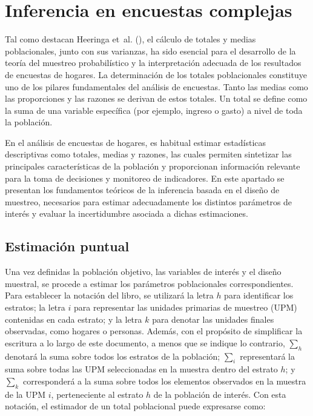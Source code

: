 \documentclass[
  spanish,
  11pt,
  letterpaper,
  oneside,
  open=any]{scrbook}
\begin{document}
\section{Inferencia en encuestas complejas}\label{inferencia-encuestas}

Tal como destacan Heeringa et~al.
(), el cálculo de totales y
medias poblacionales, junto con sus varianzas, ha sido esencial para el
desarrollo de la teoría del muestreo probabilístico y la interpretación
adecuada de los resultados de encuestas de hogares. La determinación de
los totales poblacionales constituye uno de los pilares fundamentales
del análisis de encuestas. Tanto las medias como las proporciones y las
razones se derivan de estos totales. Un total se define como la suma de
una variable específica (por ejemplo, ingreso o gasto) a nivel de toda
la población.

En el análisis de encuestas de hogares, es habitual estimar estadísticas
descriptivas como totales, medias y razones, las cuales permiten
sintetizar las principales características de la población y
proporcionan información relevante para la toma de decisiones y
monitoreo de indicadores. En este apartado se presentan los fundamentos
teóricos de la inferencia basada en el diseño de muestreo, necesarios
para estimar adecuadamente los distintos parámetros de interés y evaluar
la incertidumbre asociada a dichas estimaciones.

\subsection{Estimación puntual}\label{estimacion-puntual}

Una vez definidas la población objetivo, las variables de interés y el
diseño muestral, se procede a estimar los parámetros poblacionales
correspondientes. Para establecer la notación del libro, se utilizará la
letra \(h\) para identificar los estratos; la letra \(i\) para
representar las unidades primarias de muestreo (UPM) contenidas en cada
estrato; y la letra \(k\) para denotar las unidades finales observadas,
como hogares o personas. Además, con el propósito de simplificar la
escritura a lo largo de este documento, a menos que se indique lo
contrario, \(\sum_{h}\) denotará la suma sobre todos los estratos de la
población; \(\sum_{i}\) representará la suma sobre todas las UPM
seleccionadas en la muestra dentro del estrato \(h\); y \(\sum_{k}\)
corresponderá a la suma sobre todos los elementos observados en la
muestra de la UPM \(i\), perteneciente al estrato \(h\) de la población
de interés. Con esta notación, el estimador de un total poblacional
puede expresarse como:
\end{document}
